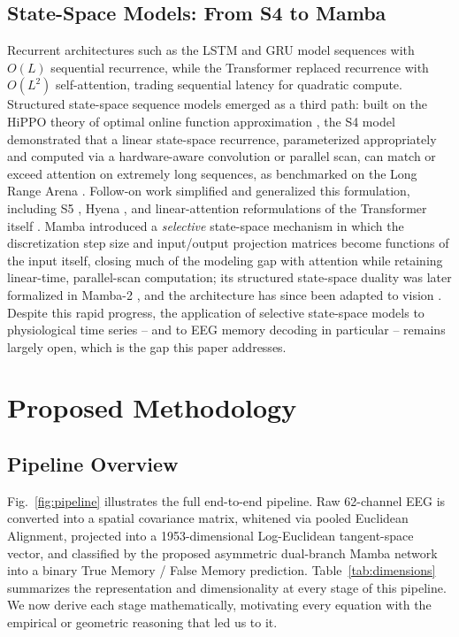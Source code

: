 \documentclass[journal]{IEEEtran}
\begin{document}
\subsection{State-Space Models: From S4 to Mamba}
Recurrent architectures such as the LSTM \cite{hochreiter1997long} and GRU \cite{cho2014learning} model sequences with $O(L)$ sequential recurrence, while the Transformer \cite{vaswani2017attention} replaced recurrence with $O(L^2)$ self-attention, trading sequential latency for quadratic compute. Structured state-space sequence models emerged as a third path: built on the HiPPO theory of optimal online function approximation \cite{gu2020hippo}, the S4 model \cite{gu2022efficiently} demonstrated that a linear state-space recurrence, parameterized appropriately and computed via a hardware-aware convolution or parallel scan, can match or exceed attention on extremely long sequences, as benchmarked on the Long Range Arena \cite{tay2021long}. Follow-on work simplified and generalized this formulation, including S5 \cite{smith2023simplified}, Hyena \cite{poli2023hyena}, and linear-attention reformulations of the Transformer itself \cite{katharopoulos2020transformers}. Mamba \cite{gu2023mamba} introduced a \emph{selective} state-space mechanism in which the discretization step size and input/output projection matrices become functions of the input itself, closing much of the modeling gap with attention while retaining linear-time, parallel-scan computation; its structured state-space duality was later formalized in Mamba-2 \cite{dao2024transformers}, and the architecture has since been adapted to vision \cite{zhu2024vision}. Despite this rapid progress, the application of selective state-space models to physiological time series -- and to EEG memory decoding in particular -- remains largely open, which is the gap this paper addresses.

\section{Proposed Methodology}
\label{sec:methodology}

\subsection{Pipeline Overview}
Fig.~\ref{fig:pipeline} illustrates the full end-to-end pipeline. Raw 62-channel EEG is converted into a spatial covariance matrix, whitened via pooled Euclidean Alignment, projected into a 1953-dimensional Log-Euclidean tangent-space vector, and classified by the proposed asymmetric dual-branch Mamba network into a binary True Memory / False Memory prediction. Table~\ref{tab:dimensions} summarizes the representation and dimensionality at every stage of this pipeline. We now derive each stage mathematically, motivating every equation with the empirical or geometric reasoning that led us to it.
\end{document}
